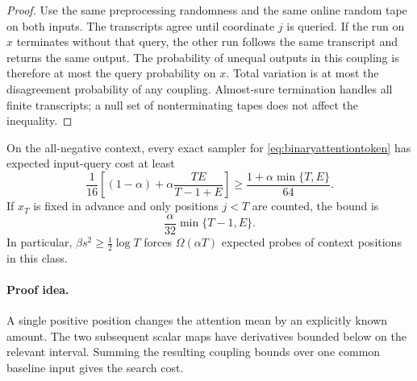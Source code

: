 \begin{proof}
Use the same preprocessing randomness and the same online random tape on
both inputs.  The transcripts agree until coordinate $j$ is queried.
If the run on $x$ terminates without that query, the other run follows the
same transcript and returns the same output.  The probability of unequal
outputs in this coupling is therefore at most the query probability on
$x$.  Total variation is at most the disagreement probability of any
coupling.  Almost-sure termination handles all finite transcripts; a
null set of nonterminating tapes does not affect the inequality.
\end{proof}

\begin{theorem}
\label{thm:attentionpositionlower}
On the all-negative context, every exact sampler for
\eqref{eq:binaryattentiontoken} has expected input-query cost at least
\begin{equation}\label{eq:attentionpositionlower}
 \frac{1}{16}\left[(1-\alpha)+
       \alpha\frac{TE}{T-1+E}\right]
 \ge\frac{1+\alpha\min\{T,E\}}{64}.
\end{equation}
If $x_T$ is fixed in advance and only positions $j<T$ are counted, the
bound is
\begin{equation}\label{eq:attentionpositionlowerprefix}
 \frac{\alpha}{32}\min\{T-1,E\}.
\end{equation}
In particular, $\beta s^2\ge\tfrac12\log T$ forces
$\Omega(\alpha T)$ expected probes of context positions in this class.
\end{theorem}
\paragraph{Proof idea.}
A single positive position changes the attention mean by an explicitly known amount.  The two subsequent scalar maps have derivatives bounded below on the relevant interval.  Summing the resulting coupling bounds over one common baseline input gives the search cost.

